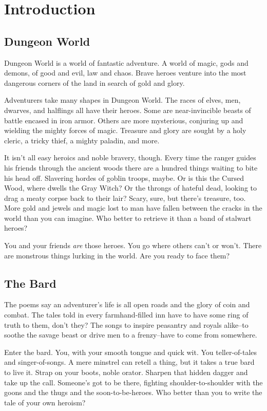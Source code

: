 \chapter{Introduction}
\section*{Dungeon World}


 Dungeon World is a world of fantastic adventure. A world of magic, gods and demons, of good and evil, law and chaos. Brave heroes venture into the most dangerous corners of the land in search of gold and glory.


 Adventurers take many shapes in Dungeon World. The races of elves, men, dwarves, and halflings all have their heroes. Some are near-invincible beasts of battle encased in iron armor. Others are more mysterious, conjuring up and wielding the mighty forces of magic. Treasure and glory are sought by a holy cleric, a tricky thief, a mighty paladin, and more.


 It isn't all easy heroics and noble bravery, though. Every time the ranger guides his friends through the ancient woods there are a hundred things waiting to bite his head off. Slavering hordes of goblin troops, maybe. Or is this the Cursed Wood, where dwells the Gray Witch? Or the throngs of hateful dead, looking to drag a meaty corpse back to their lair? Scary, sure, but there's treasure, too. More gold and jewels and magic lost to man have fallen between the cracks in the world than you can imagine. Who better to retrieve it than a band of stalwart heroes? 


 You and your friends \emph{are}
 those heroes. You go where others can't or won't. There are monstrous things lurking in the world. Are you ready to face them?
\section*{The Bard}


 The poems say an adventurer's life is all open roads and the glory of coin and combat. The tales told in every farmhand-filled inn have to have some ring of truth to them, don't they? The songs to inspire peasantry and royals alike--to soothe the savage beast or drive men to a frenzy--have to come from somewhere.


 Enter the bard. You, with your smooth tongue and quick wit. You teller-of-tales and singer-of-songs. A mere minstrel can retell a thing, but it takes a true bard to live it. Strap on your boots, noble orator. Sharpen that hidden dagger and take up the call. Someone's got to be there, fighting shoulder-to-shoulder with the goons and the thugs and the soon-to-be-heroes. Who better than you to write the tale of your own heroism?



